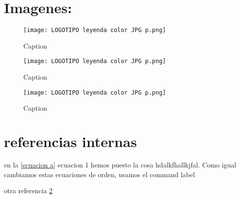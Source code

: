 \documentclass[11]{article} %
\begin{document}
\newpage
\section{Imagenes:}

\begin{figure}[H]
    \centering
    \texttt{[image: LOGOTIPO leyenda color JPG p.png]}
    \caption{Caption}
    \label{fig:logo de la ETSIT}
\end{figure}

\begin{figure}[H]
    \centering
    \texttt{[image: LOGOTIPO leyenda color JPG p.png]}
    \caption{Caption}
    \label{fig:logo de la ETSIT}
\end{figure}

\begin{figure}[H]
    \centering
    \texttt{[image: LOGOTIPO leyenda color JPG p.png]}
    \caption{Caption}
    \label{fig:logo de la ETSIT}
\end{figure}


\section{referencias internas}
\label{section: cosa}

en la \ref{ecuacion a} ecuacion 1 hemos puesto la cosa hdalkfhallkjfal. Como igual cambiamos estas ecuaciones de orden, usamos el command label

otra referencia \ref{section: cosa}
\end{document}
